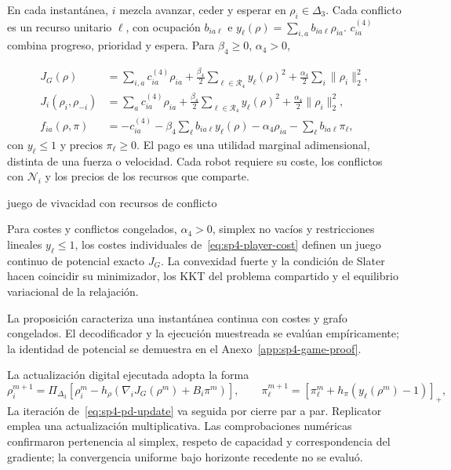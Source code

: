 En cada instantánea, $i$ mezcla avanzar, ceder y esperar en $\rho_i\in\Delta_3$. Cada conflicto es un recurso unitario $\ell$, con ocupación $b_{ia\ell}$ e $y_\ell(\rho)=\sum_{i,a}b_{ia\ell}\rho_{ia}$. $c_{ia}^{(4)}$ combina progreso, prioridad y espera. Para $\beta_4\geq0$, $\alpha_4>0$,

\begin{align}
 J_G(\rho)
 &=\sum_{i,a}c_{ia}^{(4)}\rho_{ia}
 +\frac{\beta_4}{2}\sum_{\ell\in\mathcal R_4}y_\ell(\rho)^2
 +\frac{\alpha_4}{2}\sum_i\|\rho_i\|_2^2,
 \label{eq:sp4-game-potential}\\
 J_i(\rho_i,\rho_{-i})
 &=\sum_a c_{ia}^{(4)}\rho_{ia}
 +\frac{\beta_4}{2}\sum_{\ell\in\mathcal R_4}y_\ell(\rho)^2
 +\frac{\alpha_4}{2}\|\rho_i\|_2^2,
 \label{eq:sp4-player-cost}\\
 f_{ia}(\rho,\pi)
 &=-c_{ia}^{(4)}-\beta_4\sum_\ell b_{ia\ell}y_\ell(\rho)
   -\alpha_4\rho_{ia}-\sum_\ell b_{ia\ell}\pi_\ell,
 \label{eq:sp4-payoff}
\end{align}
con $y_\ell\leq1$ y precios $\pi_\ell\geq0$. El pago es una utilidad marginal adimensional, distinta de una fuerza o velocidad. Cada robot requiere su coste, los conflictos con $\mathcal N_i$ y los precios de los recursos que comparte.

\begin{contribucion}{juego de vivacidad con recursos de conflicto}
\begin{proposicion}
\label{prop:sp4-potential}
Para costes y conflictos congelados, $\alpha_4>0$, simplex no vacíos y restricciones lineales $y_\ell\leq1$, los costes individuales de~\eqref{eq:sp4-player-cost} definen un juego continuo de potencial exacto $J_G$. La convexidad fuerte y la condición de Slater hacen coincidir su minimizador, los KKT del problema compartido y el equilibrio variacional de la relajación.
\end{proposicion}
La proposición caracteriza una instantánea continua con costes y grafo congelados. El decodificador y la ejecución muestreada se evalúan empíricamente; la identidad de potencial se demuestra en el Anexo~\ref{app:sp4-game-proof}.
\end{contribucion}

La actualización digital ejecutada adopta la forma
\begin{equation}
\label{eq:sp4-pd-update}
\rho_i^{m+1}=\Pi_{\Delta_3}\!\left[\rho_i^m-h_\rho
  \left(\nabla_iJ_G(\rho^m)+B_i\pi^m\right)\right],\qquad
\pi_\ell^{m+1}=\left[\pi_\ell^m+h_\pi(y_\ell(\rho^m)-1)\right]_+,
\end{equation}
La iteración de~\eqref{eq:sp4-pd-update} va seguida por cierre par a par. Replicator emplea una actualización multiplicativa. Las comprobaciones numéricas confirmaron pertenencia al simplex, respeto de capacidad y correspondencia del gradiente; la convergencia uniforme bajo horizonte recedente no se evaluó.

